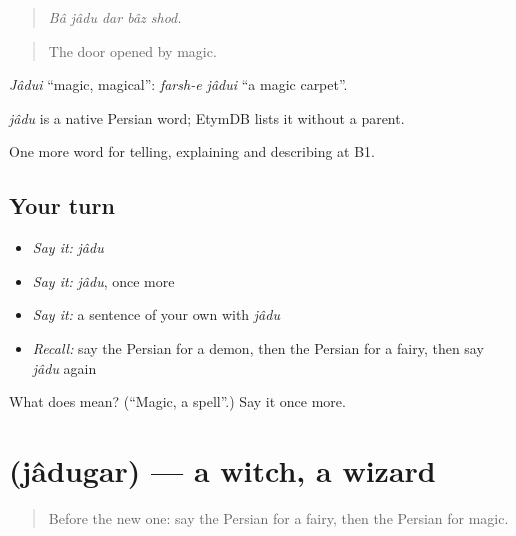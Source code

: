 \begin{quote}
\emph{Bâ jâdu dar bâz shod.}
\end{quote}

\begin{quote}
The door opened by magic.
\end{quote}

\emph{Jâdui} \textquotedblleft{}magic, magical\textquotedblright{}: \emph{farsh-e jâdui} \textquotedblleft{}a magic carpet\textquotedblright{}.

\begin{cousinweb}
\emph{jâdu} is a native Persian word; EtymDB lists it without a parent.
\end{cousinweb}

\begin{grammarlens}[title={What you've built}]
One more word for telling, explaining and describing at B1.
\end{grammarlens}

\subsection*{Your turn}
\begin{itemize}
\raggedright
  \item \emph{Say it:} \emph{jâdu}
  \item \emph{Say it:} \emph{jâdu}, once more
  \item \emph{Say it:} a sentence of your own with \emph{jâdu}
  \item \emph{Recall:} say the Persian for a demon, then the Persian for a fairy, then say \emph{jâdu} again
\end{itemize}

\begin{tcolorbox}[breakable,colback=teal!4,colframe=teal!35!black,title={Before you move on}]
What does  mean? (\textquotedblleft{}Magic, a spell\textquotedblright{}.) Say it once more.
\end{tcolorbox}
\section[\texorpdfstring{\fa{جادوگر} (jâdugar)}{جادوگر (jâdugar)}]{ (jâdugar) — a witch, a wizard}

\label{lesson:FA-C348-jadugar}



\begin{quote}
Before the new one: say the Persian for a fairy, then the Persian for magic.
\end{quote}

